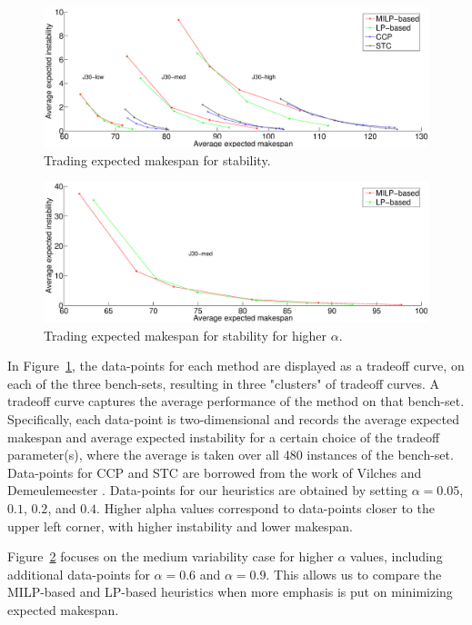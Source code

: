  	\begin{figure} 
 		\centering   
   		\includegraphics[width=1.0\textwidth]{chapter/mista-stability/figure1.eps}
 		\caption{Trading expected makespan for stability.}
 		\label{fig-experiments-1}
 	\end{figure}
 	
  	\begin{figure} 
 		\centering  
   		\includegraphics[width=1.0\textwidth]{chapter/mista-stability/figure2.eps}
 		\caption{Trading expected makespan for stability for higher $\alpha$.}
 		\label{fig-experiments-2}
 	\end{figure}
 	
 	In Figure~\ref{fig-experiments-1},
 	the data-points for each method are displayed as a tradeoff curve, 
 	on each of the three bench-sets, resulting in three "clusters" of tradeoff curves.
 	A tradeoff curve captures the average performance of the method on that bench-set.
 	Specifically, each data-point is two-dimensional and records the average expected makespan and average 
 	expected instability for a certain choice of the tradeoff parameter(s),
 	where the average is taken over all 480 instances of the bench-set.
  	Data-points for CCP and STC are borrowed
 	from the work of Vilches and Demeulemeester \cite{lamas2015}.	
  	Data-points for our heuristics are obtained by setting $\alpha=0.05$, $0.1$, $0.2$, and $0.4$.
 	Higher alpha values correspond to data-points closer to the upper left corner,
 	with higher instability and lower makespan.	
 	
 	Figure~\ref{fig-experiments-2} focuses on the medium variability case for higher $\alpha$ values,
 	including additional data-points for $\alpha=0.6$ and $\alpha=0.9$.
 	This allows us to compare the MILP-based and LP-based heuristics when
 	more emphasis is put on minimizing expected makespan.
 	
